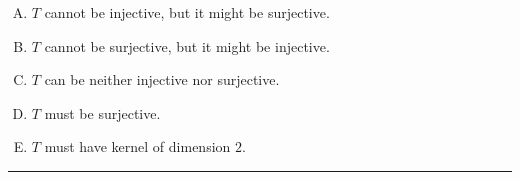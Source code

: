 \documentclass[12pt]{amsart}
\newcommand{\divider}{
  \vspace{-1em} %
  \noindent
  \raisebox{-0.15ex}{\textbullet}%
  \hspace{0.5em}%
  \rule[0.5ex]{0.95\textwidth}{1.0pt}%
  \hspace{0.5em}%
  \raisebox{-0.15ex}{\textbullet}%
  \vspace{0em} %
}
\begin{document}
\begin{enumerate}[(A)]
\item $T$ cannot be injective, but it might be surjective.
\item $T$ cannot be surjective, but it might be injective.
\item $T$ can be neither injective nor surjective.
\item $T$ must be surjective.
\item $T$ must have kernel of dimension $2$.
\end{enumerate}


\divider
\end{document}
